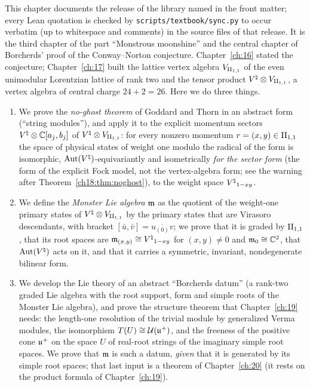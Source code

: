 This chapter documents the release of the library named in the front matter; every Lean quotation is checked by
\texttt{scripts/textbook/sync.py} to occur verbatim (up to whitespace and comments) in the source files of that
release.
It is the third chapter of the part ``Monstrous moonshine'' and the central chapter of Borcherds' proof
of the Conway--Norton conjecture.  Chapter~\ref{ch:16} stated the conjecture; Chapter~\ref{ch:17}
built the lattice vertex algebra $V_{\mathrm{II}_{1,1}}$ of the even unimodular Lorentzian lattice of rank two and
the tensor product ${V^{\natural}}\otimes V_{\mathrm{II}_{1,1}}$, a vertex algebra of central charge $24+2=26$.  Here we
do three things.
\begin{enumerate}[label=(\Roman*)]
\item We prove the \emph{no-ghost theorem} of Goddard and Thorn in an abstract form (``string
  modules''), and apply it to the explicit momentum sectors ${V^{\natural}}\otimes\mathbb C[a_j,b_j]$ of
  ${V^{\natural}}\otimes V_{\mathrm{II}_{1,1}}$: for every nonzero momentum $r=(x,y)\in\mathrm{II}_{1,1}$ the space of
  physical states of weight one modulo the radical of the form is isomorphic, $\operatorname{Aut}({V^{\natural}})$-equivariantly and
  isometrically \emph{for the sector form} (the form of the explicit Fock model, not the vertex-algebra form; see the
  warning after Theorem~\ref{ch18:thm:noghost}), to the weight space ${V^{\natural}}_{1-xy}$.
\item We define the \emph{Monster Lie algebra} $\mathfrak{m}$ as the quotient of the weight-one
  primary states of ${V^{\natural}}\otimes V_{\mathrm{II}_{1,1}}$ by the primary states that are Virasoro
  descendants, with bracket $[\bar u,\bar v]=\overline{u_{(0)}v}$; we prove that it is graded by
  $\mathrm{II}_{1,1}$, that its root spaces are $\mathfrak{m}_{(x,y)}\cong{V^{\natural}}_{1-xy}$ for $(x,y)\neq 0$ and
  $\mathfrak{m}_0\cong\mathbb C^2$, that $\operatorname{Aut}({V^{\natural}})$ acts on it, and that it carries a symmetric,
  invariant, nondegenerate bilinear form.
\item We develop the Lie theory of an abstract ``Borcherds datum'' (a rank-two graded Lie algebra
  with the root support, form and simple roots of the Monster Lie algebra), and prove the structure
  theorem that Chapter~\ref{ch:19} needs: the length-one resolution of the trivial module by
  generalized Verma modules, the isomorphism $T(U)\cong \mathcal U(\mathfrak{u}^+)$, and the freeness of the
  positive cone $\mathfrak{u}^+$ on the space $U$ of real-root strings of the imaginary simple root
  spaces.  We prove that $\mathfrak{m}$ is such a datum, \emph{given} that it is generated by its simple
  root spaces; that last input is a theorem of Chapter~\ref{ch:20} (it rests on the product formula
  of Chapter~\ref{ch:19}).
\end{enumerate}

